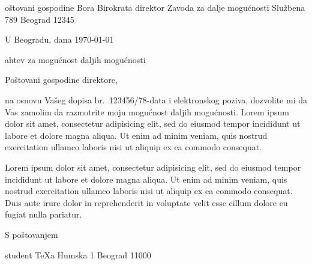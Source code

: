 
\fontfam[bonum]
\srllang

\address
  Poštovani gospodine
  Bora Birokrata
  direktor Zavoda za dalje mogućnosti
  Službena 789
  Beograd 12345

\hfill U Beogradu, dana \today

\subject Zahtev za mogućnost daljih mogućnosti

Poštovani gospodine direktore,

na osnovu Vašeg dopisa br.~123456/78-data i elektronskog poziva, dozvolite mi 
da Vas zamolim da razmotrite moju mogućnost daljih mogućnosti. 
Lorem ipsum dolor sit amet, consectetur adipisicing elit, sed do
eiusmod tempor incididunt ut labore et dolore magna aliqua. Ut enim ad minim
veniam, quis nostrud exercitation ullamco laboris nisi ut aliquip ex ea
commodo consequat. 

Lorem ipsum dolor sit amet, consectetur adipisicing elit, sed do
eiusmod tempor incididunt ut labore et dolore magna aliqua. Ut enim ad minim
veniam, quis nostrud exercitation ullamco laboris nisi ut aliquip ex ea
commodo consequat. Duis aute irure dolor in reprehenderit in voluptate velit
esse cillum dolore eu fugiat nulla pariatur. 

S poštovanjem

\hfill \address
  {\it Vuk Djukanović}
  student \TeX a
  Humska 1
  Beograd 11000

\bye
